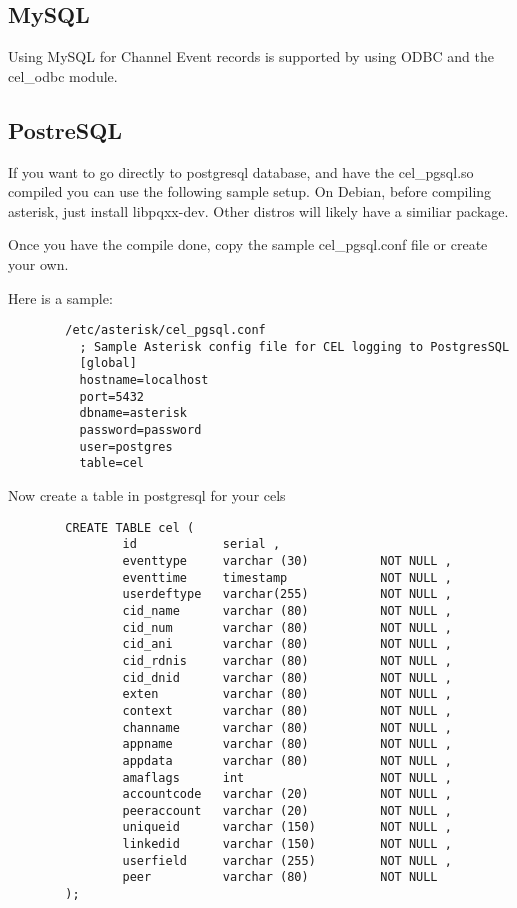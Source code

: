 \subsection{MySQL}

Using MySQL for Channel Event records is supported by using ODBC and the cel_odbc module.

\subsection{PostreSQL}
        If you want to go directly to postgresql database, and have the cel_pgsql.so
        compiled you can use the following sample setup.
        On Debian, before compiling asterisk, just install libpqxx-dev.
        Other distros will likely have a similiar package.

        Once you have the compile done,
        copy the sample cel_pgsql.conf file or create your own.

        Here is a sample:
\begin{verbatim}
        /etc/asterisk/cel_pgsql.conf
          ; Sample Asterisk config file for CEL logging to PostgresSQL
          [global]
          hostname=localhost
          port=5432
          dbname=asterisk
          password=password
          user=postgres
          table=cel
\end{verbatim}
        Now create a table in postgresql for your cels

\begin{verbatim}
        CREATE TABLE cel (
                id            serial ,
                eventtype     varchar (30)          NOT NULL ,
                eventtime     timestamp             NOT NULL ,
                userdeftype   varchar(255)          NOT NULL ,
                cid_name      varchar (80)          NOT NULL ,
                cid_num       varchar (80)          NOT NULL ,
                cid_ani       varchar (80)          NOT NULL ,
                cid_rdnis     varchar (80)          NOT NULL ,
                cid_dnid      varchar (80)          NOT NULL ,
                exten         varchar (80)          NOT NULL ,
                context       varchar (80)          NOT NULL ,
                channame      varchar (80)          NOT NULL ,
                appname       varchar (80)          NOT NULL ,
                appdata       varchar (80)          NOT NULL ,
                amaflags      int                   NOT NULL ,
                accountcode   varchar (20)          NOT NULL ,
                peeraccount   varchar (20)          NOT NULL ,
                uniqueid      varchar (150)         NOT NULL ,
                linkedid      varchar (150)         NOT NULL ,
                userfield     varchar (255)         NOT NULL ,
                peer          varchar (80)          NOT NULL
        );
\end{verbatim}

